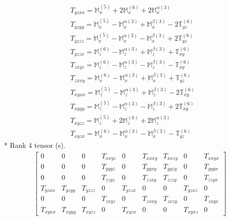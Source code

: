 \documentclass[fleqn,8pt,landscape]{jsarticle}
\begin{document}
\begin{align*}
& T_{yzxx} = \mathbb{M}_{x}^{(5)} + 2 \mathbb{M}_{x}^{(6)} + 2 \mathbb{M}_{x}^{\alpha(3)} \\
& T_{yzyy} = \mathbb{M}_{x}^{(5)} - \mathbb{M}_{x}^{\alpha(3)} + \mathbb{M}_{x}^{\beta(3)} - 2 \mathbb{T}_{yz}^{(6)} \\
& T_{yzzz} = \mathbb{M}_{x}^{(5)} - \mathbb{M}_{x}^{\alpha(3)} - \mathbb{M}_{x}^{\beta(3)} + 2 \mathbb{T}_{yz}^{(6)} \\
& T_{yzzx} = \mathbb{M}_{z}^{(6)} - \mathbb{M}_{z}^{\alpha(3)} + \mathbb{M}_{z}^{\beta(3)} + \mathbb{T}_{xy}^{(6)} \\
& T_{zxyz} = \mathbb{M}_{z}^{(6)} - \mathbb{M}_{z}^{\alpha(3)} - \mathbb{M}_{z}^{\beta(3)} - \mathbb{T}_{xy}^{(6)} \\
& T_{zxxy} = \mathbb{M}_{x}^{(6)} - \mathbb{M}_{x}^{\alpha(3)} + \mathbb{M}_{x}^{\beta(3)} + \mathbb{T}_{yz}^{(6)} \\
& T_{xyxx} = \mathbb{M}_{z}^{(5)} - \mathbb{M}_{z}^{\alpha(3)} + \mathbb{M}_{z}^{\beta(3)} - 2 \mathbb{T}_{xy}^{(6)} \\
& T_{xyyy} = \mathbb{M}_{z}^{(5)} - \mathbb{M}_{z}^{\alpha(3)} - \mathbb{M}_{z}^{\beta(3)} + 2 \mathbb{T}_{xy}^{(6)} \\
& T_{xyzz} = \mathbb{M}_{z}^{(5)} + 2 \mathbb{M}_{z}^{(6)} + 2 \mathbb{M}_{z}^{\alpha(3)} \\
& T_{xyzx} = \mathbb{M}_{x}^{(6)} - \mathbb{M}_{x}^{\alpha(3)} - \mathbb{M}_{x}^{\beta(3)} - \mathbb{T}_{yz}^{(6)}
\end{align*}
* Rank 4 tensor (s).
\begin{align*}
\begin{bmatrix} 0 & 0 & 0 & T_{xxyz} & 0 & T_{xxxy} & T_{xxzy} & 0 & T_{xxyx} \\ 0 & 0 & 0 & T_{yyyz} & 0 & T_{yyxy} & T_{yyzy} & 0 & T_{yyyx} \\ 0 & 0 & 0 & T_{zzyz} & 0 & T_{zzxy} & T_{zzzy} & 0 & T_{zzyx} \\ T_{yzxx} & T_{yzyy} & T_{yzzz} & 0 & T_{yzzx} & 0 & 0 & T_{yzxz} & 0 \\ 0 & 0 & 0 & T_{zxyz} & 0 & T_{zxxy} & T_{zxzy} & 0 & T_{zxyx} \\ T_{xyxx} & T_{xyyy} & T_{xyzz} & 0 & T_{xyzx} & 0 & 0 & T_{xyxz} & 0 \end{bmatrix}
\end{align*}
\end{document}
